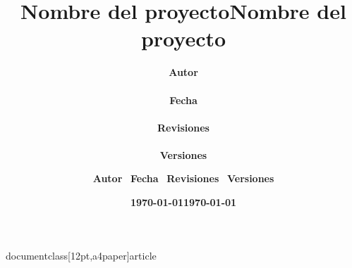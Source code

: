 documentclass[12pt,a4paper]{article}

\usepackage[utf8]{inputenc}
\usepackage[T1]{fontenc}
\usepackage[spanish]{babel}
\usepackage{amsmath,amssymb,amsfonts,amsthm}
\usepackage{graphicx}
\usepackage{hyperref}
\usepackage{url}
\usepackage{cite}

\title{\textbf{Nombre del proyecto}}
\author{\textbf{Autor} \\\\
        \textbf{Fecha} \\\\
        \textbf{Revisiones} \\\\
        \textbf{Versiones}}
\date{\textbf{\today}}

\usepackage{geometry}

\usepackage{titlesec}
\titleformat{\section}[hang]
  {\normalfont\Large\bfseries}{\thesection}{1em}{}
\titleformat{\subsection}[hang]
  {\normalfont\large\bfseries}{\thesubsection}{1em}{}
\titleformat{\subsubsection}[hang]
  {\normalfont\normalsize\bfseries}{\thesubsubsection}{1em}{}

\usepackage{tocloft}
\renewcommand{\cfttoctitlefont}{\hfill\Large\bfseries}
\renewcommand{\cftaftertoctitle}{\hfill}
\renewcommand{\cftsecfont}{\bfseries}
\renewcommand{\cftsubsecfont}{\normalfont}
\renewcommand{\cftsubsubsecfont}{\normalfont}
\setlength{\cftsecindent}{0pt}
\setlength{\cftsubsecindent}{20pt}
\setlength{\cftsubsubsecindent}{40pt}

\title{\textbf{Nombre del proyecto}}
\author{\textbf{Autor} \ \textbf{Fecha} \ \textbf{Revisiones} \ \textbf{Versiones}}
\date{\textbf{\today}}



\maketitle

